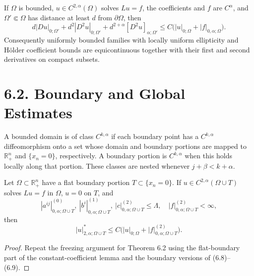 \begin{corollary}
\label{gt-ch06-cor-6-3}
If $\Omega$ is bounded, $u\in C^{2,\alpha}(\Omega)$ solves $Lu=f$, the
coefficients and $f$ are $C^\alpha$, and $\Omega'\Subset\Omega$ has distance
at least $d$ from $\partial\Omega$, then
\begin{equation}\tag{6.23}
d|Du|_{0;\Omega'}+d^2|D^2u|_{0;\Omega'}+d^{2+\alpha}[D^2u]_{\alpha;\Omega'}
\le C\bigl(|u|_{0;\Omega}+|f|_{0,\alpha;\Omega}\bigr).
\end{equation}
Consequently uniformly bounded families with locally uniform ellipticity and
H\"older coefficient bounds are equicontinuous together with their first and
second derivatives on compact subsets.
\end{corollary}

\section*{6.2. Boundary and Global Estimates}

A bounded domain is of class $C^{k,\alpha}$ if each boundary point has a
$C^{k,\alpha}$ diffeomorphism onto a set whose domain and boundary portions
are mapped to $\mathbb R^n_+$ and $\{x_n=0\}$, respectively.  A boundary
portion is $C^{k,\alpha}$ when this holds locally along that portion.  These
classes are nested whenever $j+\beta<k+\alpha$.

\begin{lemma}
\label{gt-ch06-lem-6-4}
Let $\Omega\subset\mathbb R^n_+$ have a flat boundary portion $T\subset\{x_n=0\}$.
If $u\in C^{2,\alpha}(\Omega\cup T)$ solves $Lu=f$ in $\Omega$, $u=0$ on
$T$, and
\begin{equation}\tag{6.26}
|a^{ij}|_{0,\alpha;\Omega\cup T}^{(0)},\ |b^i|_{0,\alpha;\Omega\cup T}^{(1)},\ |c|_{0,\alpha;\Omega\cup T}^{(2)}\le\Lambda,
\quad |f|_{0,\alpha;\Omega\cup T}^{(2)}<\infty,
\end{equation}
then
\begin{equation}\tag{6.27}
|u|^*_{2,\alpha;\Omega\cup T}
\le C\bigl(|u|_{0;\Omega}+|f|_{0,\alpha;\Omega\cup T}^{(2)}\bigr).
\end{equation}
\end{lemma}
\begin{proof}
\sketch Repeat the freezing argument for Theorem 6.2 using the flat-boundary
part of the constant-coefficient lemma and the boundary versions of (6.8)--(6.9).
\end{proof}


